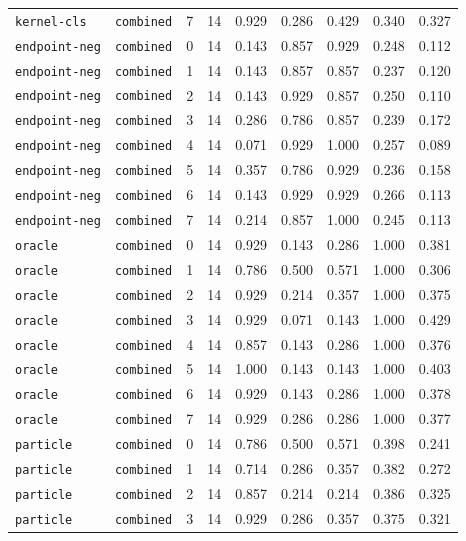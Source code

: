 \documentclass{article}
\begin{document}
\begin{center}
{\begin{tabular}{llllccccc}
\texttt{kernel-cls} & \texttt{combined} & 7 & 14 & 0.929 & 0.286 & 0.429 & 0.340 & 0.327 \\
\texttt{endpoint-neg} & \texttt{combined} & 0 & 14 & 0.143 & 0.857 & 0.929 & 0.248 & 0.112 \\
\texttt{endpoint-neg} & \texttt{combined} & 1 & 14 & 0.143 & 0.857 & 0.857 & 0.237 & 0.120 \\
\texttt{endpoint-neg} & \texttt{combined} & 2 & 14 & 0.143 & 0.929 & 0.857 & 0.250 & 0.110 \\
\texttt{endpoint-neg} & \texttt{combined} & 3 & 14 & 0.286 & 0.786 & 0.857 & 0.239 & 0.172 \\
\texttt{endpoint-neg} & \texttt{combined} & 4 & 14 & 0.071 & 0.929 & 1.000 & 0.257 & 0.089 \\
\texttt{endpoint-neg} & \texttt{combined} & 5 & 14 & 0.357 & 0.786 & 0.929 & 0.236 & 0.158 \\
\texttt{endpoint-neg} & \texttt{combined} & 6 & 14 & 0.143 & 0.929 & 0.929 & 0.266 & 0.113 \\
\texttt{endpoint-neg} & \texttt{combined} & 7 & 14 & 0.214 & 0.857 & 1.000 & 0.245 & 0.113 \\
\texttt{oracle} & \texttt{combined} & 0 & 14 & 0.929 & 0.143 & 0.286 & 1.000 & 0.381 \\
\texttt{oracle} & \texttt{combined} & 1 & 14 & 0.786 & 0.500 & 0.571 & 1.000 & 0.306 \\
\texttt{oracle} & \texttt{combined} & 2 & 14 & 0.929 & 0.214 & 0.357 & 1.000 & 0.375 \\
\texttt{oracle} & \texttt{combined} & 3 & 14 & 0.929 & 0.071 & 0.143 & 1.000 & 0.429 \\
\texttt{oracle} & \texttt{combined} & 4 & 14 & 0.857 & 0.143 & 0.286 & 1.000 & 0.376 \\
\texttt{oracle} & \texttt{combined} & 5 & 14 & 1.000 & 0.143 & 0.143 & 1.000 & 0.403 \\
\texttt{oracle} & \texttt{combined} & 6 & 14 & 0.929 & 0.143 & 0.286 & 1.000 & 0.378 \\
\texttt{oracle} & \texttt{combined} & 7 & 14 & 0.929 & 0.286 & 0.286 & 1.000 & 0.377 \\
\texttt{particle} & \texttt{combined} & 0 & 14 & 0.786 & 0.500 & 0.571 & 0.398 & 0.241 \\
\texttt{particle} & \texttt{combined} & 1 & 14 & 0.714 & 0.286 & 0.357 & 0.382 & 0.272 \\
\texttt{particle} & \texttt{combined} & 2 & 14 & 0.857 & 0.214 & 0.214 & 0.386 & 0.325 \\
\texttt{particle} & \texttt{combined} & 3 & 14 & 0.929 & 0.286 & 0.357 & 0.375 & 0.321 \\
\bottomrule
\end{tabular}%
}
\end{center}
\end{document}
